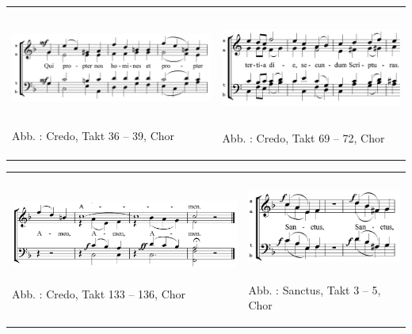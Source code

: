 \begin{flushleft}
\tablefirsthead{}
\tablehead{}
\tabletail{}
\tablelasttail{}
\begin{supertabular}{m{8.281cm}m{7.6990004cm}}

\includegraphics[width=8.098cm,height=3.069cm]{pictures/zulassungsarbeit-img111.png}

Abb. : Credo, Takt 36 – 39, Chor &

\includegraphics[width=7.207cm,height=3.216cm]{pictures/zulassungsarbeit-img112.png}

Abb. : Credo, Takt 69 – 72, Chor\\
\end{supertabular}
\end{flushleft}
\begin{flushleft}
\tablefirsthead{}
\tablehead{}
\tabletail{}
\tablelasttail{}
\begin{supertabular}{m{8.778cm}m{6.208cm}}

\includegraphics[width=8.595cm,height=2.515cm]{pictures/zulassungsarbeit-img113.png}

Abb. : Credo, Takt 133 – 136, Chor &

\includegraphics[width=5.681cm,height=2.76cm]{pictures/zulassungsarbeit-img114.png}

Abb. : Sanctus, Takt 3 – 5, Chor\\
\end{supertabular}
\end{flushleft}
